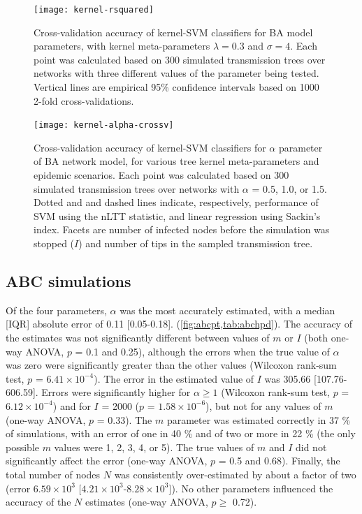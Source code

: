 \documentclass[12pt]{article}\usepackage[]{graphicx}\usepackage[]{color}
\begin{document}
\begin{figure}[ht]
  \centering
  \texttt{[image: kernel-rsquared]}
  \caption{
    Cross-validation accuracy of kernel-SVM classifiers for \gls{BA} model
    parameters, with kernel meta-parameters $\lambda = 0.3$ and $\sigma = 4$.
    Each point was calculated based on 300 simulated transmission trees over
    networks with three different values of the parameter being tested.
    Vertical lines are empirical 95\% confidence intervals based on 1000 2-fold
    cross-validations.
  }
  \label{fig:rsquared}
\end{figure}

\begin{figure}[ht]
  \centering
  \texttt{[image: kernel-alpha-crossv]}
  \caption{
    Cross-validation accuracy of kernel-SVM classifiers for $\alpha$ parameter
    of \gls{BA} network model, for various tree kernel meta-parameters and
    epidemic scenarios. Each point was calculated based on 300 simulated
    transmission trees over networks with $\alpha$ = 0.5, 1.0, or 1.5. Dotted
    and and dashed lines indicate, respectively, performance of SVM using the
    \gls{nLTT} statistic, and linear regression using Sackin's index. Facets
    are number of infected nodes before the simulation was stopped ($I$) and
    number of tips in the sampled transmission tree.
  }
  \label{fig:crossv}
\end{figure}

\subsection*{ABC simulations}



Of the four parameters, $\alpha$ was the most accurately estimated, with a
median [IQR] absolute error of 
    0.11 
    [0.05-0.18].
(\cref{fig:abcpt,tab:abchpd}). The accuracy of the estimates was not
significantly different between values of $m$ or $I$ (both one-way ANOVA,
    $p$ = 0.1
and 
    0.25),
although the errors when the true value of $\alpha$ was zero were
significantly greater than the other values 
    (Wilcoxon rank-sum test, $p$ = \ensuremath{6.41\times 10^{-4}}).
The error in the estimated value of $I$ was
    305.66 
    [107.76-606.59].
Errors were significantly higher for $\alpha \geq 1$
    (Wilcoxon rank-sum test, $p$ = \ensuremath{6.12\times 10^{-4}})
and for $I$ = 2000
    ($p$ = \ensuremath{1.58\times 10^{-6}}),
but not for any values of $m$
    (one-way ANOVA, $p$ = 0.33).
The $m$ parameter was estimated correctly in
    37 \%
of simulations, with an error of one in
    40 \%
and of two or more in 
    22 \%
(the only possible $m$ values were 1, 2, 3, 4, or 5). The true values of $m$
and $I$ did not significantly affect the error
    (one-way ANOVA, $p$ = 0.5 and
                          0.68).
Finally, the total number of nodes $N$ was consistently over-estimated by about
a factor of two
    (error \ensuremath{6.59\times 10^{3}} 
    [\ensuremath{4.21\times 10^{3}}-\ensuremath{8.28\times 10^{3}}]).
No other parameters influenced the accuracy of the $N$ estimates 
    (one-way ANOVA, $p \geq$ 0.72).
\end{document}
